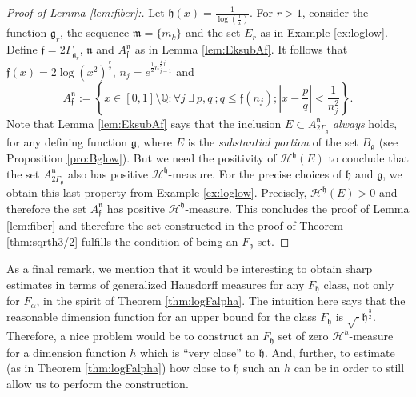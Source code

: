 \documentclass[11pt,a4paper]{amsart}
\begin{document}
\begin{proof}[Proof of Lemma \ref{lem:fiber}:] 
Let ${\mathfrak{h}}(x)=\frac{1}{\log(\frac{1}{x})}$.  For $r>1$, consider the function ${\mathfrak{g}}_r$, the sequence ${\mathfrak{m}}=\{m_k\}$ and the set $E_r$ as in Example \ref{ex:loglow}. Define ${\mathfrak{f}}=2\Gamma_{{\mathfrak{g}}_r}$, ${\mathfrak{n}}$ and  $A^{\mathfrak{n}}_{\mathfrak{f}}$ as in Lemma \ref{lem:EksubAf}. It follows that ${\mathfrak{f}}(x)=2\log(x^2)^\frac{r}{2}$, $n_j=e^{\frac{1}{2}n_{j-1}^{\frac{4}{r}j}}$ and 
\begin{equation*}
A^{\mathfrak{n}}_{\mathfrak{f}}:=\left\{x\in[0,1]\setminus {\mathbb{Q}}: \forall j\ \exists\ p,q\ ;
q\le {\mathfrak{f}}(n_j); |x-\frac{p}{q}|<\frac{1}{n_j^2}\right\}.
\end{equation*}
Note that Lemma \ref{lem:EksubAf} says that the inclusion $E\subset A^{\mathfrak{n}}_{2\Gamma_{\mathfrak{g}}}$ \emph{always} holds, for any defining function ${\mathfrak{g}}$, where $E$ is the \emph{substantial portion} of the set $B_{\mathfrak{g}}$ (see Proposition \ref{pro:Bglow}). But we need the positivity of ${\mathcal{H}^{{\mathfrak{h}}}}(E)$ to conclude that the set $A^{\mathfrak{n}}_{2\Gamma_{\mathfrak{g}}}$ also has positive ${\mathcal{H}^{{\mathfrak{h}}}}$-measure. For the precise choices of ${\mathfrak{h}}$ and ${\mathfrak{g}}$, we obtain this last property from Example \ref{ex:loglow}. Precisely, ${\mathcal{H}^{{\mathfrak{h}}}}(E)>0$ and therefore the set $A^{\mathfrak{n}}_{\mathfrak{f}}$ has positive ${\mathcal{H}^{{\mathfrak{h}}}}$-measure. This concludes the proof of Lemma \ref{lem:fiber} and therefore the set constructed in the proof of Theorem \ref{thm:sqrth3/2} fulfills the condition of being an $F_{\mathfrak{h}}$-set.
\end{proof}

As a final remark, we mention that it would be interesting to obtain sharp estimates in terms of generalized Hausdorff measures for any $F_{\mathfrak{h}}$ class, not only for $F_\alpha$, in the spirit of Theorem \ref{thm:logFalpha}. The intuition here says that the reasonable dimension function for an upper bound for the class $F_{\mathfrak{h}}$ is $\sqrt{\cdot}{\mathfrak{h}}^{\frac{3}{2}} $. Therefore, a nice problem would be to construct an $F_{\mathfrak{h}}$ set of zero ${\mathcal{H}^{{h}}}$-measure for a dimension function $h$ which is ``very close'' to ${\mathfrak{h}}$. And, further, to estimate (as in Theorem \ref{thm:logFalpha}) how close to ${\mathfrak{h}}$ such an $h$ can be in order to still allow us to perform the construction. 
\end{document}
